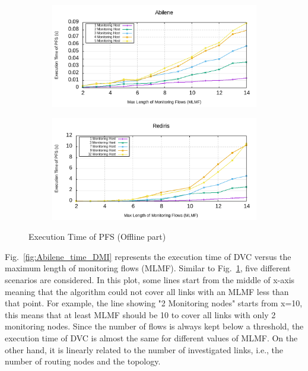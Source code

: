 \documentclass[10pt, journal, letterpaper]{IEEEtran}
\begin{document}
\begin{figure}
    \begin{subfigure}{\columnwidth}
       \centering
        \includegraphics[width=0.8\columnwidth]{img/eval_Abilene_Max_Length_of_Routes_Execution_time_ILP.png}
    \end{subfigure}
    \begin{subfigure}{\columnwidth}
      \centering
      \includegraphics[width=0.8\columnwidth]{img/eval_Rediris_Max_Length_of_Routes_Execution_time_ILP.png}
    \end{subfigure}
    \caption{Execution Time of PFS (Offline part)}
    \label{fig:Abilene_time_PFS}
\end{figure}

Fig.~\ref{fig:Abilene_time_DMI} represents the execution time of DVC versus the maximum length of monitoring flows (MLMF). Similar to Fig.~\ref{fig:Abilene_time_PFS}, five different scenarios are considered. In this plot, some lines start from the middle of x-axis meaning that the algorithm could not cover all links with an MLMF less than that point. For example, the line showing "2 Monitoring nodes" starts from x=10, this means that at least MLMF should be 10 to cover all links with only 2 monitoring nodes. Since the number of flows is always kept below a threshold, the execution time of DVC is almost the same for different values of MLMF. On the other hand, it is linearly related to the number of investigated links, i.e., the number of routing nodes and the topology.
\end{document}
